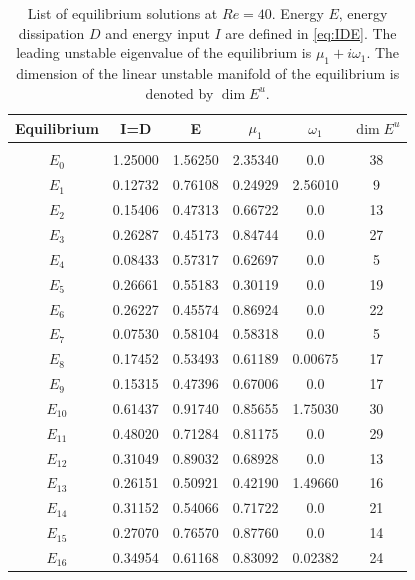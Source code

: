 \documentclass{article}
\begin{document}
\begin{table}
\centering
\begin{tabular}{c c c c c c}
Equilibrium &  I=D       & E          & $\mu_1$ & $\omega_1$ &  $\dim E^u$ \\
\hline\\
$E_0$    &  1.25000   & 1.56250    & 2.35340 &   0.0      & 38  \\
$E_1$    &  0.12732   & 0.76108    & 0.24929 &  2.56010   & 9   \\
$E_2$    &  0.15406   & 0.47313    & 0.66722 &   0.0      & 13  \\
$E_3$    &  0.26287   & 0.45173    & 0.84744 &   0.0      & 27  \\
$E_4$    &  0.08433   & 0.57317    & 0.62697 &   0.0      & 5   \\
$E_5$    &  0.26661   & 0.55183    & 0.30119 &   0.0      & 19  \\
$E_6$    &  0.26227   & 0.45574    & 0.86924 &   0.0      & 22  \\
$E_7$    &  0.07530   & 0.58104    & 0.58318 &   0.0      & 5   \\
$E_8$    &  0.17452   & 0.53493    & 0.61189 &   0.00675  & 17  \\
$E_9$    &  0.15315   & 0.47396    & 0.67006 &   0.0      & 17  \\
$E_{10}$ &  0.61437   & 0.91740    & 0.85655 &   1.75030  & 30  \\
$E_{11}$ &  0.48020   & 0.71284    & 0.81175 &   0.0      & 29  \\
$E_{12}$ &  0.31049   & 0.89032    & 0.68928 &   0.0      & 13  \\
$E_{13}$ &  0.26151   & 0.50921    & 0.42190 &   1.49660  & 16  \\
$E_{14}$ &  0.31152   & 0.54066    & 0.71722 &   0.0      & 21  \\
$E_{15}$ &  0.27070   & 0.76570    & 0.87760 &   0.0      & 14  \\
$E_{16}$ &  0.34954   & 0.61168    & 0.83092 &   0.02382  & 24  \\
\end{tabular}
\caption{List of equilibrium solutions at $Re=40$.
Energy $E$, energy dissipation $D$ and energy input $I$ are
	defined in \eqref{eq:IDE}.
    The leading unstable
	eigenvalue of the equilibrium is $\mu_1+i\omega_1$. The dimension of the linear unstable
    manifold of the equilibrium is denoted by $\dim E^u$.}
\label{tab:EQ}
\end{table}
\end{document}
